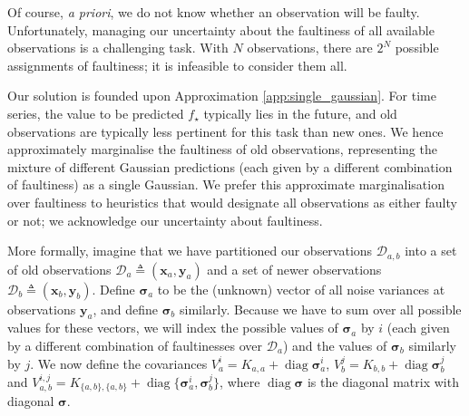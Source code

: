 \documentclass{article} %
\newcommand{\deq}{\ensuremath{\triangleq}}
\newcommand{\cm}[1]{\ensuremath{\mathcal{#1}}}
\newcommand{\bm}[1]{\ensuremath{\mathbf{#1}}}
\newcommand{\data}{\ensuremath{\cm{D}}}
\newcommand{\vect}[1]{\bm{#1}}
\newcommand{\vy}{\vect{y}}
\newcommand{\vx}{\vect{x}}
\newcommand{\vs}{\vect{\sigma}}
\newcommand{\st}{_{\star}}
\newcommand{\defequal}{=}
\DeclareMathOperator{\diag}{diag}
\begin{document}
Of course, {\it a priori}, we do not know whether an
observation will be faulty.  Unfortunately, managing our uncertainty
about the faultiness of all available observations is a
challenging task. With $N$ observations, there are $2^N$
possible assignments of faultiness; it is infeasible to consider them all.

Our solution is founded upon Approximation \ref{app:single_gaussian}. 
For time series, the value to be predicted $f\st$
typically lies in the future, and old observations are
typically less pertinent for this task than new ones. We hence approximately marginalise the faultiness of old observations, representing the mixture of different Gaussian predictions (each given by a different combination of faultiness) as a single Gaussian.
We prefer this approximate marginalisation over
faultiness to heuristics that would designate all
observations as either faulty or not; we acknowledge our
uncertainty about faultiness.

More formally, imagine that we have partitioned our observations
$\data_{a,b}$ into a set of old observations
$\data_a\deq(\vx_a,\vy_a)$ and a set of newer observations $\data_b
\deq (\vx_b,\vy_b)$. Define $\vs_{a}$ to be the (unknown) vector of
all noise variances at observations $\vy_{a}$, and define $\vs_{b}$
similarly. Because we have to sum over all possible values for these
vectors, we will index the possible values of
$\vs_{a}$ by $i$ (each given by a different combination of
faultinesses over $\data_a$) and the values of $\vs_{b}$ similarly by
$j$. We now define the covariances
 $V_a^i  \defequal K_{a,a} + \diag \vs_{a}^i$,
 $V_b^j  \defequal K_{b,b} + \diag \vs_{b}^j$ and
 $V_{a,b}^{i,j} \defequal K_{\{a,b\},\{a,b\}} + \diag \{\vs_{a}^i,\vs_{b}^j\}$,
where $\diag \vs$ is the diagonal matrix with diagonal $\vs$. 
\end{document}
